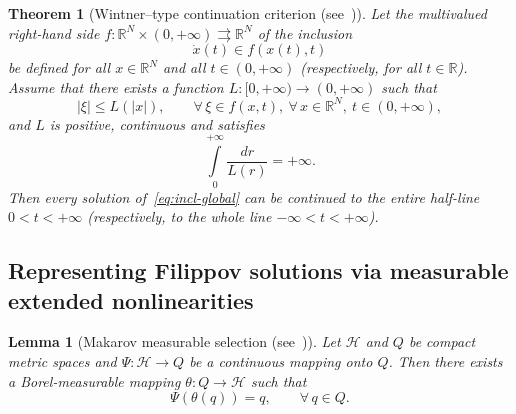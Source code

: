 \documentclass[journal]{IEEEtran}
\newtheorem{theorem}{Theorem}
\newtheorem{lemma}{Lemma}
\begin{document}
\begin{theorem}[Wintner--type continuation criterion (see~{\cite[Thm.~1.3]{YLG}})]
Let the multivalued right-hand side $f:\mathbb{R}^N\times(0,+\infty)
\rightrightarrows\mathbb{R}^N$ of the inclusion
\begin{equation}\label{eq:incl-global}
   \dot x(t) \in f(x(t),t)
\end{equation}
be defined for all $x\in\mathbb{R}^N$ and all $t\in(0,+\infty)$
(\emph{respectively,} for all $t\in\mathbb{R}$).
Assume that there exists a function $L:[0,+\infty)\to(0,+\infty)$
such that
\begin{equation}\label{eq:L-bound}
   |\xi| \le L(|x|),
   \qquad \forall\,\xi\in f(x,t),\ \forall\,x\in\mathbb{R}^N,\
          t\in(0,+\infty),
\end{equation}
and $L$ is positive, continuous and satisfies
\begin{equation}\label{eq:Wintner-integral}
   \int\limits_0^{+\infty} \frac{dr}{L(r)} = +\infty.
\end{equation}
Then every solution of~\eqref{eq:incl-global} can be continued to the
entire half-line $0<t<+\infty$
(\emph{respectively,} to the whole line $-\infty<t<+\infty$).
\end{theorem}


\subsection{Representing Filippov solutions via measurable extended nonlinearities}

\begin{lemma}[Makarov measurable selection (see~{\cite[Lem.~1.2]{YLG}})]\label{lemma:makarov}
Let $\mathcal{H}$ and $Q$ be compact metric spaces and
$\Psi:\mathcal{H}\to Q$ be a continuous mapping onto $Q$.
Then there exists a Borel-measurable mapping
$\theta:Q\to\mathcal{H}$ such that
\[
   \Psi(\theta(q)) = q, \qquad \forall\,q\in Q.
\]
\end{lemma}
\end{document}
